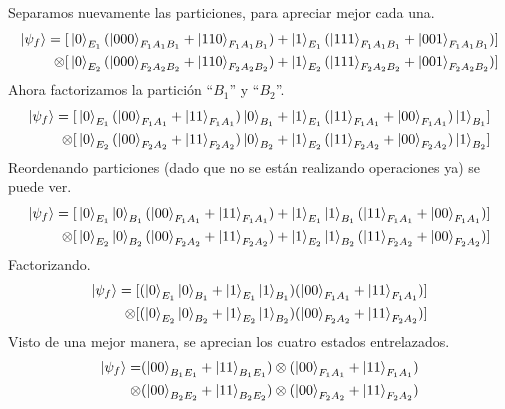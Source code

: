 Separamos nuevamente las particiones, para apreciar mejor cada una.
\begin{align*}
 \ket{\psi_f} = [ 
  & \ket{0}_{E_1}(\ket{000}_{F_1 A_1 B_1}+\ket{110}_{F_1 A_1 B_1})
  + \ket{1}_{E_1}(\ket{111}_{F_1 A_1 B_1}+\ket{001}_{F_1 A_1 B_1}) ]\\ \otimes 
[ & \ket{0}_{E_2}(\ket{000}_{F_2 A_2 B_2}+\ket{110}_{F_2 A_2 B_2})
  + \ket{1}_{E_2}(\ket{111}_{F_2 A_2 B_2}+\ket{001}_{F_2 A_2 B_2}) ]
\end{align*}
Ahora factorizamos la partición ``$B_1$'' y ``$B_2$''.
\begin{align*}
 \ket{\psi_f} = [ 
  & \ket{0}_{E_1}(\ket{00}_{F_1 A_1}+\ket{11}_{F_1 A_1})\ket{0}_{B_1}
  + \ket{1}_{E_1}(\ket{11}_{F_1 A_1}+\ket{00}_{F_1 A_1})\ket{1}_{B_1} ]\\ \otimes 
[ & \ket{0}_{E_2}(\ket{00}_{F_2 A_2}+\ket{11}_{F_2 A_2})\ket{0}_{B_2}
  + \ket{1}_{E_2}(\ket{11}_{F_2 A_2}+\ket{00}_{F_2 A_2})\ket{1}_{B_2} ]
\end{align*}
Reordenando particiones (dado que no se están realizando operaciones ya) se puede ver.
\begin{align*}
 \ket{\psi_f} = [ 
  & \ket{0}_{E_1}\ket{0}_{B_1}(\ket{00}_{F_1 A_1}+\ket{11}_{F_1 A_1})
  + \ket{1}_{E_1}\ket{1}_{B_1}(\ket{11}_{F_1 A_1}+\ket{00}_{F_1 A_1}) ]\\ \otimes 
[ & \ket{0}_{E_2}\ket{0}_{B_2}(\ket{00}_{F_2 A_2}+\ket{11}_{F_2 A_2})
  + \ket{1}_{E_2}\ket{1}_{B_2}(\ket{11}_{F_2 A_2}+\ket{00}_{F_2 A_2}) ]
\end{align*}
Factorizando.
\begin{align*}
 \ket{\psi_f} = [ 
  & (\ket{0}_{E_1}\ket{0}_{B_1}+\ket{1}_{E_1}\ket{1}_{B_1})(\ket{00}_{F_1 A_1}+\ket{11}_{F_1 A_1})]\\ \otimes 
[ & (\ket{0}_{E_2}\ket{0}_{B_2}+\ket{1}_{E_2}\ket{1}_{B_2})(\ket{00}_{F_2 A_2}+\ket{11}_{F_2 A_2}) ]
\end{align*}
Visto de una mejor manera, se aprecian los cuatro estados entrelazados.
\begin{align*}
 \ket{\psi_f} =  
  & (\ket{00}_{B_1 E_1}+\ket{11}_{B_1 E_1})\otimes (\ket{00}_{F_1 A_1}+\ket{11}_{F_1 A_1})\\ \otimes 
 & (\ket{00}_{B_2 E_2}+\ket{11}_{B_2 E_2})\otimes (\ket{00}_{F_2 A_2}+\ket{11}_{F_2 A_2}) 
\end{align*}

